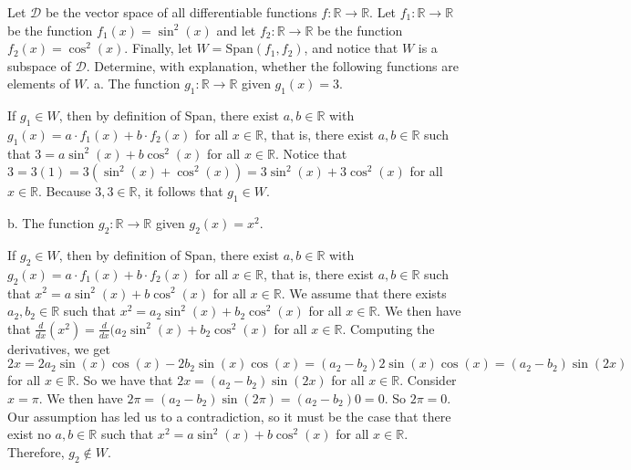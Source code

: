 \documentclass[12pt]{article}
\newenvironment{problem}[2][Problem]
{
	\begin{trivlist} 
		\item[\hskip \labelsep {\bfseries #1 #2:}]
	}
{
	\end{trivlist}
	}
\newenvironment{solution}[1][Solution]
{
	\begin{trivlist} 
		\item[\hskip \labelsep {\itshape #1:}]
	}
	{
	\end{trivlist}
}
\begin{document}
\newpage
\begin{problem}{4}
Let $\mathcal{D}$ be the vector space of all differentiable functions $f : \mathbb{R} \to \mathbb{R}$. Let $f_1 :\mathbb{R} \to \mathbb{R}$ be the function $f_1 (x) = \sin ^2 (x)$ and let $f_2 :\mathbb{R} \to \mathbb{R}$ be the function $f_2 (x) = \cos ^2 (x)$. Finally, let $W = \text{Span}(f_1 , f_2 )$, and notice that $W$ is a subspace of $\mathcal{D}$. Determine, with explanation, whether the following functions are elements of $W$.
\noindent
\newline
\newline
a. The function $g_1 : \mathbb{R} \to \mathbb{R}$ given $g_1 (x) = 3$.
\begin{solution}
If $g_1 \in W$, then by definition of Span, there exist $a,b \in \mathbb{R}$ with $g_1(x) = a\cdot f_1(x) + b\cdot f_2(x)$ for all $x\in \mathbb{R}$, that is, there exist $a,b \in \mathbb{R}$ such that $3 = a\sin ^2 (x) + b\cos ^2 (x)$ for all $x \in \mathbb{R}$. Notice that $3 = 3(1) = 3( \sin ^2 (x) + \cos ^2 (x)) = 3\sin ^2 (x) + 3\cos ^2 (x)$ for all $x \in \mathbb{R}$. Because $3,3\in \mathbb{R}$, it follows that $g_1 \in W$.
\end{solution}
\noindent
\newline
\newline
b. The function $g_2 : \mathbb{R} \to \mathbb{R}$ given $g_2 (x) = x^2$.
\begin{solution}
If $g_2 \in W$, then by definition of Span, there exist $a,b \in \mathbb{R}$ with $g_2(x) = a\cdot f_1(x) + b\cdot f_2(x)$ for all $x\in \mathbb{R}$, that is, there exist $a,b \in \mathbb{R}$ such that $x^2 = a\sin ^2 (x) + b\cos ^2 (x)$ for all $x \in \mathbb{R}$. We assume that there exists $a_2,b_2 \in \mathbb{R}$ such that $x^2 = a_2 \sin ^2 (x) + b_2 \cos ^2 (x)$ for all $x \in \mathbb{R}$. We then have that $\frac{d}{dx} (x^2) = \frac{d}{dx} (a_2 \sin ^2 (x) + b_2 \cos ^2 (x)$ for all $x \in \mathbb{R}$. Computing the derivatives, we get $2x = 2a_2 \sin (x) \cos (x) - 2b_2 \sin (x) \cos (x) = (a_2 - b_2) 2 \sin(x) \cos(x) =(a_2 - b_2) \sin (2x)$ for all $x \in \mathbb{R}$. So we have that $ 2x = (a_2 - b_2) \sin (2x)$ for all $x \in \mathbb{R}$. Consider $x=\pi$. We then have $2 \pi = (a_2 - b_2) \sin (2\pi) = (a_2 - b_2)0 = 0$. So $2 \pi =0$. Our assumption has led us to a contradiction, so it must be the case that there exist no $a,b \in \mathbb{R}$ such that $x^2 = a\sin ^2 (x) + b\cos ^2 (x)$ for all $x \in \mathbb{R}$. Therefore, $g_2 \notin W$.
\end{solution}

\end{problem}
\end{document}
